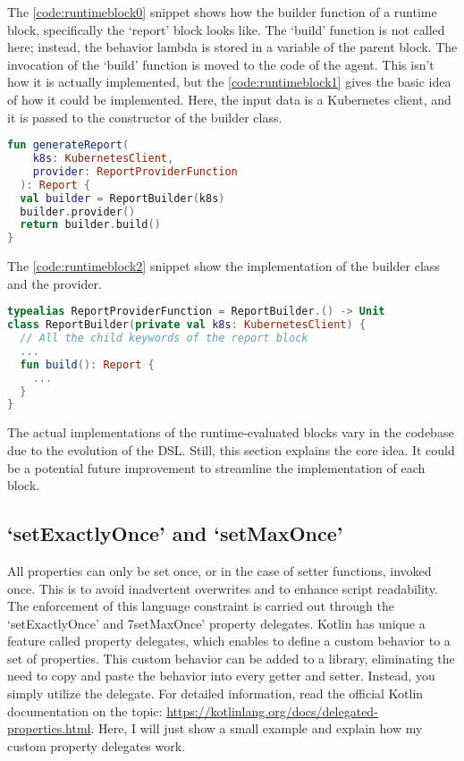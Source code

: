 The \ref{code:runtimeblock0} snippet shows how the builder function of a runtime block, specifically the `report' block looks like. The `build' function is not called here; instead, the behavior lambda is stored in a variable of the parent block. The invocation of the `build' function is moved to the code of the agent. This isn't how it is actually implemented, but the \ref{code:runtimeblock1} gives the basic idea of how it could be implemented. Here, the input data is a Kubernetes client, and it is passed to the constructor of the builder class.

\begin{lstlisting}[caption={Build a report},language=Kotlin,label=code:runtimeblock1]
fun generateReport(
    k8s: KubernetesClient, 
    provider: ReportProviderFunction
  ): Report {
  val builder = ReportBuilder(k8s)
  builder.provider()
  return builder.build()
}
\end{lstlisting}

The \ref{code:runtimeblock2} snippet show the implementation of the builder class and the provider.

\begin{lstlisting}[caption={Report builder class and provider},language=Kotlin,label=code:runtimeblock2]
typealias ReportProviderFunction = ReportBuilder.() -> Unit
class ReportBuilder(private val k8s: KubernetesClient) {
  // All the child keywords of the report block
  ...
  fun build(): Report {
    ...
  }
}
\end{lstlisting}

The actual implementations of the runtime-evaluated blocks vary in the codebase due to the evolution of the DSL. Still, this section explains the core idea. It could be a potential future improvement to streamline the implementation of each block.

\subsection{`setExactlyOnce' and `setMaxOnce'}

All properties can only be set once, or in the case of setter functions, invoked once. This is to avoid inadvertent overwrites and to enhance script readability. The enforcement of this language constraint is carried out through the `setExactlyOnce' and 7setMaxOnce' property delegates. Kotlin has unique a feature called property delegates, which enables to define a custom behavior to a set of properties. This custom behavior can be added to a library, eliminating the need to copy and paste the behavior into every getter and setter. Instead, you simply utilize the delegate. For detailed information, read the official Kotlin documentation on the topic: \url{https://kotlinlang.org/docs/delegated-properties.html}. Here, I will just show a small example and explain how my custom property delegates work.

